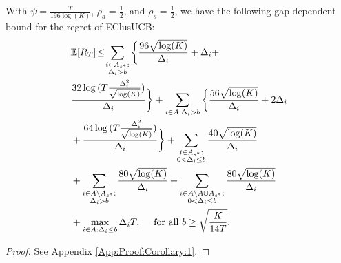 \begin{corollary}
\label{Result:Corollary:1}
With $\psi=\frac{T}{196\log (K)}$, $\rho_{a}=\frac{1}{2}$, and $\rho_{s}=\frac{1}{2}$,  we have the following gap-dependent bound for the regret of EClusUCB:
\begin{align*}
&\mathbb{E} [R_T] \!\le\! 
\sum_{\substack{i\in A_{s^{*}}:\\\Delta_{i} > b}}\bigg\lbrace \frac{96\sqrt{\log (K)}}{\Delta_{i}} + \Delta_{i} + \\
& \frac{32\log{(T\frac{\Delta_{i}^{2}}{\sqrt{\log (K)}})}}{\Delta_{i}} \bigg\rbrace + \sum_{i\in A:\Delta_{i} > b}\bigg\lbrace\frac{56\sqrt{\log (K)}}{\Delta_{i}} + 2\Delta_{i} \\
& + \frac{64\log{(T\frac{\Delta_{i}^{2}}{\sqrt{\log (K)}})}}{\Delta_{i}}\bigg\rbrace
	  + \sum\limits_{\substack{i\in A_{s^{*}}:\\0< \Delta_{i} \leq b}}\frac{40\sqrt{\log (K)}}{\Delta_{i}}\\
	& + \sum\limits_{\substack{i\in A\setminus A_{s^{*}}:\\\Delta_{i} > b}}\frac{80\sqrt{\log (K)}}{\Delta_{i}} + \sum\limits_{\substack{i\in A\setminus A \cup A_{s^{*}}:\\0 < \Delta_{i}\leq b}}\frac{80\sqrt{\log (K)}}{\Delta_{i}} \\
	& + \max\limits_{i\in A:\Delta_{i}\leq b}\Delta_{i}T, \quad \text{ for all }b\geq \sqrt{\frac{K}{14 T}}.
	\end{align*} 
\end{corollary}
\begin{proof}
 See Appendix \ref{App:Proof:Corollary:1}.
\end{proof}


